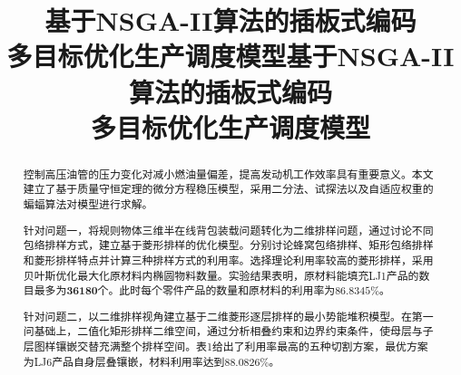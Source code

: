 \documentclass{whutmod}
\title{基于NSGA-II算法的插板式编码\\多目标优化生产调度模型}
\begin{document}
	\thispagestyle{empty}
	\title{基于NSGA-II算法的插板式编码\\多目标优化生产调度模型}
	\maketitle %
	\begin{abstract}
		控制高压油管的压力变化对减小燃油量偏差，提高发动机工作效率具有重要意义。本文建立了基于质量守恒定理的微分方程稳压模型，采用二分法、试探法以及自适应权重的蝙蝠算法对模型进行求解。
		\vspace{7pt}	%
	
		针对问题一，将规则物体三维半在线背包装载问题转化为二维排样问题，通过讨论不同包络排样方式，建立基于菱形排样的优化模型。分别讨论蜂窝包络排样、矩形包络排样和菱形排样特点并计算三种排样方式的利用率。选择理论利用率较高的菱形排样，采用贝叶斯优化最大化原材料内椭圆物料数量。实验结果表明，原材料能填充LJ1产品的数目最多为$\mathbf{36180}$个。此时每个零件产品的数量和原材料的利用率为$\mathbf{86.8345\%}$。

		\vspace{7pt}	%
		
		针对问题二，以二维排样视角建立基于二维菱形逐层排样的最小势能堆积模型。在第一问基础上，二值化矩形排样二维空间，通过分析相叠约束和边界约束条件，使母层与子层图样镶嵌交替充满整个排样空间。表1给出了利用率最高的五种切割方案，最优方案为LJ6产品自身层叠镶嵌，材料利用率达到$\mathbf{88.0826\%}$。
		

\end{abstract}
\end{document}
